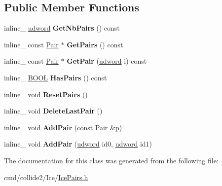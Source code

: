 \subsection*{Public Member Functions}
\begin{DoxyCompactItemize}
\item 
inline\+\_\+ \hyperlink{IceTypes_8h_a44c6f1920ba5551225fb534f9d1a1733}{udword} {\bfseries Get\+Nb\+Pairs} () const \hypertarget{classPairs_a9201b00bc05c79f7334b8b5c6a90f787}{}\label{classPairs_a9201b00bc05c79f7334b8b5c6a90f787}

\item 
inline\+\_\+ const \hyperlink{structPair}{Pair} $\ast$ {\bfseries Get\+Pairs} () const \hypertarget{classPairs_a6c8b74acf325318c400aa7a3fd6d295f}{}\label{classPairs_a6c8b74acf325318c400aa7a3fd6d295f}

\item 
inline\+\_\+ const \hyperlink{structPair}{Pair} $\ast$ {\bfseries Get\+Pair} (\hyperlink{IceTypes_8h_a44c6f1920ba5551225fb534f9d1a1733}{udword} i) const \hypertarget{classPairs_a135f82ecd87457b29ed427ed0475e8a6}{}\label{classPairs_a135f82ecd87457b29ed427ed0475e8a6}

\item 
inline\+\_\+ \hyperlink{IceTypes_8h_a050c65e107f0c828f856a231f4b4e788}{B\+O\+OL} {\bfseries Has\+Pairs} () const \hypertarget{classPairs_a1572b4e19897022d0b3c3860e8f44c0c}{}\label{classPairs_a1572b4e19897022d0b3c3860e8f44c0c}

\item 
inline\+\_\+ void {\bfseries Reset\+Pairs} ()\hypertarget{classPairs_a8a7f05f4bca0be313bd7b54f490d1612}{}\label{classPairs_a8a7f05f4bca0be313bd7b54f490d1612}

\item 
inline\+\_\+ void {\bfseries Delete\+Last\+Pair} ()\hypertarget{classPairs_a9ead31fc8e7b2cd255a6e7c2e05489c6}{}\label{classPairs_a9ead31fc8e7b2cd255a6e7c2e05489c6}

\item 
inline\+\_\+ void {\bfseries Add\+Pair} (const \hyperlink{structPair}{Pair} \&p)\hypertarget{classPairs_ace27a4afb4fd2e3a5ad5dc819afb79ff}{}\label{classPairs_ace27a4afb4fd2e3a5ad5dc819afb79ff}

\item 
inline\+\_\+ void {\bfseries Add\+Pair} (\hyperlink{IceTypes_8h_a44c6f1920ba5551225fb534f9d1a1733}{udword} id0, \hyperlink{IceTypes_8h_a44c6f1920ba5551225fb534f9d1a1733}{udword} id1)\hypertarget{classPairs_a19f74d2f1adefafd827b749c06b0682c}{}\label{classPairs_a19f74d2f1adefafd827b749c06b0682c}

\end{DoxyCompactItemize}


The documentation for this class was generated from the following file\+:\begin{DoxyCompactItemize}
\item 
cmd/collide2/\+Ice/\hyperlink{IcePairs_8h}{Ice\+Pairs.\+h}\end{DoxyCompactItemize}
